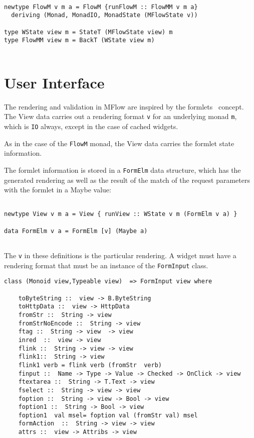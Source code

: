 \documentclass{tmr}
\begin{document}
{\tt 
 
\begin{verbatim} 
 
newtype FlowM v m a = FlowM {runFlowM :: FlowMM v m a} 
  deriving (Monad, MonadIO, MonadState (MFlowState v)) 
 
type WState view m = StateT (MFlowState view) m 
type FlowMM view m = BackT (WState view m) 
 
\end{verbatim} 
 
} 
 
\section{User Interface} 
The rendering and validation in MFlow are inspired by the  formlets~\cite{auth:formlets} concept. The View  data carries out a rendering format {\tt v} for an underlying monad {\tt m}, which is {\tt IO} always, except in the case of cached widgets.
 
As in the case of the {\tt FlowM} monad, the View data carries the formlet state information. 
 
The formlet information is stored in a {\tt FormElm} data structure, which has the generated rendering as well as the result of the match of the request parameters with the formlet  in a Maybe value: 
{\tt 
 
\begin{verbatim} 
 
newtype View v m a = View { runView :: WState v m (FormElm v a) } 
 
data FormElm v a = FormElm [v] (Maybe a) 
 
\end{verbatim} 
 
} 
The {\tt v} in these definitions is the particular rendering.  A widget must have a rendering format that must be an instance of the {\tt FormInput} class. 
 
{\tt 
 
\begin{verbatim} 
class (Monoid view,Typeable view)  => FormInput view where 
 
    toByteString ::  view -> B.ByteString 
    toHttpData ::  view -> HttpData 
    fromStr ::  String -> view 
    fromStrNoEncode ::  String -> view 
    ftag ::  String -> view  -> view 
    inred  ::  view -> view 
    flink ::  String -> view -> view 
    flink1::  String -> view 
    flink1 verb = flink verb (fromStr  verb) 
    finput ::  Name -> Type -> Value -> Checked -> OnClick -> view 
    ftextarea ::  String -> T.Text -> view 
    fselect ::  String -> view -> view 
    foption ::  String -> view -> Bool -> view 
    foption1 ::  String -> Bool -> view 
    foption1  val msel= foption val (fromStr val) msel 
    formAction  ::  String -> view -> view 
    attrs ::  view -> Attribs -> view 
 
 
\end{verbatim} 
 
} 
 
\end{document}
